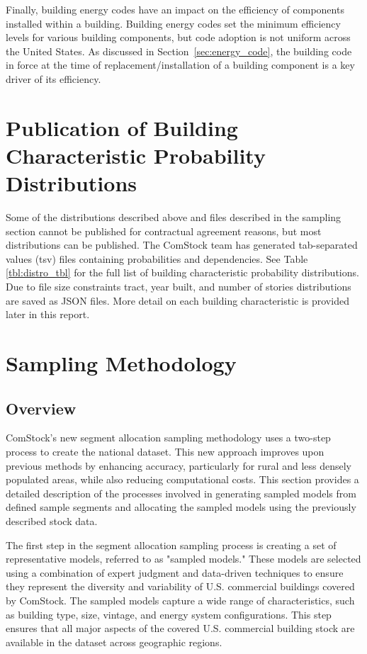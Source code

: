 Finally, building energy codes have an impact on the efficiency of components installed within a building. Building energy codes set the minimum efficiency levels for various building components, but code adoption is not uniform across the United States. As discussed in Section~\ref{sec:energy_code}, the building code in force at the time of replacement/installation of a building component is a key driver of its efficiency.

\section{Publication of Building Characteristic Probability Distributions}
Some of the distributions described above and files described in the sampling section cannot be published for contractual agreement reasons, but most distributions can be published. The ComStock team has generated tab-separated values (tsv) files containing probabilities and dependencies. See Table \ref{tbl:distro_tbl} for the full list of building characteristic probability distributions. Due to file size constraints tract, year built, and number of stories distributions are saved as JSON files. More detail on each building characteristic is provided later in this report.



\section{Sampling Methodology} \label{SamplingMethodology}
\subsection{Overview}
ComStock's new segment allocation sampling methodology uses a two-step process to create the national dataset. This new approach improves upon previous methods by enhancing accuracy, particularly for rural and less densely populated areas, while also reducing computational costs. This section provides a detailed description of the processes involved in generating sampled models from defined sample segments and allocating the sampled models using the previously described stock data.

The first step in the segment allocation sampling process is creating a set of representative models, referred to as "sampled models." These models are selected using a combination of expert judgment and data-driven techniques to ensure they represent the diversity and variability of U.S. commercial buildings covered by ComStock. The sampled models capture a wide range of characteristics, such as building type, size, vintage, and energy system configurations. This step ensures that all major aspects of the covered U.S. commercial building stock are available in the dataset across geographic regions.


